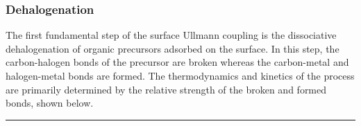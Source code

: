 \documentclass[%
 reprint,
 amsmath,amssymb,
 aps,
prb,
]{revtex4-2}
\begin{document}

\subsubsection{Dehalogenation}

The first fundamental step of the surface Ullmann coupling is the dissociative dehalogenation of organic precursors adsorbed on the surface. In this step, the carbon-halogen bonds of the precursor are broken whereas the carbon-metal and halogen-metal bonds are formed. The thermodynamics and kinetics of the process are primarily determined by the relative strength of the broken and formed bonds, shown below. 

\rule{\columnwidth}{0.4pt}
\end{document}

